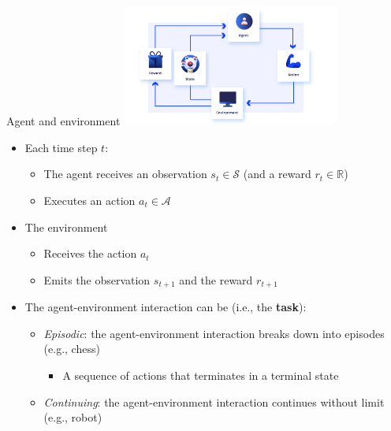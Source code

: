 \documentclass[presentation, 9pt]{beamer}\mode<presentation>{\usetheme{AMSBolognaFC}}
\begin{document}
\begin{frame}{Agent and environment}
\centering
\includegraphics[height=4cm]{img/interaction-loop.png}
\begin{itemize}
	\item Each time step $t$:
	\begin{itemize}
		\item The agent receives an observation $s_t \in \mathcal{S}$ (and a reward $r_t \in \mathbb{R}$)
		\item Executes an action $a_t \in \mathcal{A}$
	\end{itemize}
	\item The environment 
	\begin{itemize}
		\item Receives the action $a_t$
		\item Emits the observation $s_{t+1}$ and the reward $r_{t+1}$
	\end{itemize}
	\item The agent-environment interaction can be (i.e., the \textbf{task}):
	\begin{itemize}
		\item \emph{Episodic}: the agent-environment interaction breaks down into episodes (e.g., chess)
		\begin{itemize}
			\item A sequence of actions that terminates in a terminal state
		\end{itemize}
		\item \emph{Continuing}: the agent-environment interaction continues without limit (e.g., robot)
	\end{itemize}
\end{itemize}
\end{frame}
\end{document}
